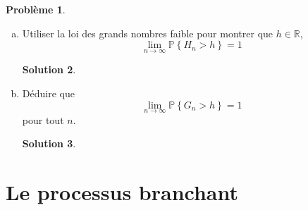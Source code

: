 \documentclass[11pt]{amsart}
\theoremstyle{definition}
\newtheorem{probleme}{Problème}
\newtheorem*{solution}{Solution}
\theoremstyle{remark}
\numberwithin{equation}{section}
\newcommand{\R} {\mathbb{R}}
\newcommand{\PR} {\mathbb P}
\newcommand{\ac}[1]{\left\{ #1 \right\}} %
\newcommand \1 {\mathbbm 1}
\begin{document}
\begin{probleme}
\begin{enumerate}[(a)]
		\begin{solution}
		\end{solution}
		\vspace{0.3cm}
			
			
			
			\item Utiliser la loi des grands nombres faible pour montrer que $h \in \R$,
			$$\lim_{n \to \infty} \PR \ac{H_n > h} = 1$$
		
		\begin{solution}
		\end{solution}
		\vspace{0.3cm}
			
			\item Déduire que $$\lim_{n \to \infty} \PR\ac{G_n > h} = 1$$ pour tout $n$.
		
		\begin{solution}
		\end{solution}
		\vspace{0.3cm}
			
		\end{enumerate}
	\end{probleme}
	
	\newpage
	\section{Le processus branchant}
	
\end{document}
